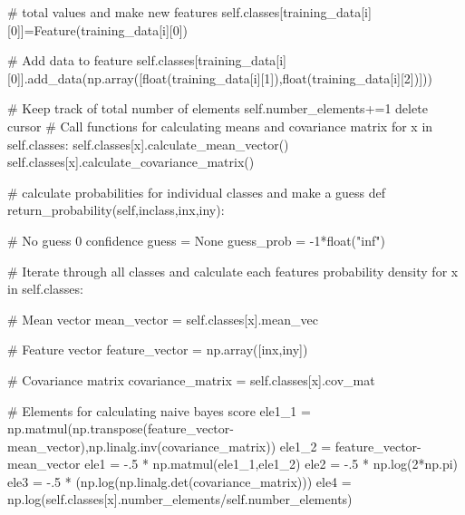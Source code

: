 \documentclass{article}
\begin{document}
\begin{flushleft}
\begin{python}
                                # total values and make new features
                                self.classes[training_data[i][0]]=Feature(training_data[i][0])
                        
                        # Add data to feature
                        self.classes[training_data[i][0]].add_data(np.array([float(training_data[i][1]),float(training_data[i][2])]))
                
                        # Keep track of total number of elements
                        self.number_elements+=1
                        delete cursor
                        # Call functions for calculating means and covariance matrix
                        for x in self.classes:
                        self.classes[x].calculate_mean_vector()
                        self.classes[x].calculate_covariance_matrix()
                
                # calculate probabilities for individual classes and make a guess
                def return_probability(self,inclass,inx,iny):
                        
                        # No guess 0 confidence
                        guess = None
                        guess_prob = -1*float("inf")
                        
                        # Iterate through all classes and calculate each features probability density
                        for x in self.classes:
                        
                                # Mean vector            
                                mean_vector = self.classes[x].mean_vec
                        
                                # Feature vector
                                feature_vector = np.array([inx,iny])
                        
                                # Covariance matrix
                                covariance_matrix = self.classes[x].cov_mat
                                
                                # Elements for calculating naive bayes score
                                ele1_1 = np.matmul(np.transpose(feature_vector-mean_vector),np.linalg.inv(covariance_matrix))
                                ele1_2 = feature_vector-mean_vector
                                ele1 = -.5 * np.matmul(ele1_1,ele1_2)
                                ele2 = -.5 * np.log(2*np.pi)
                                ele3 = -.5 * (np.log(np.linalg.det(covariance_matrix)))
                                ele4 = np.log(self.classes[x].number_elements/self.number_elements)
                        

\end{python}
\end{flushleft}
\end{document}
